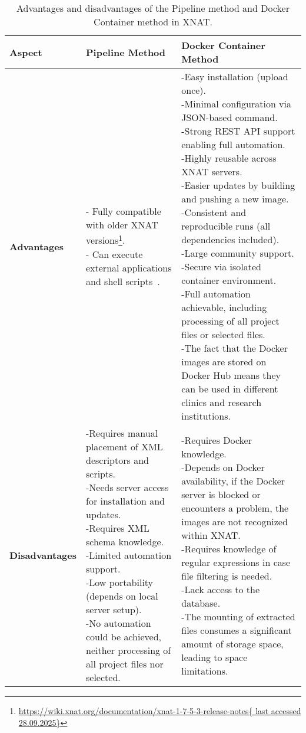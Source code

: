 \begin{table}[htbp]
\centering
\caption{Advantages and disadvantages of the Pipeline method and Docker Container method in XNAT.}
\renewcommand{\arraystretch}{1.3}
\begin{tabular}{|p{3cm}|p{6cm}|p{6cm}|}
\hline
\textbf{Aspect} & \textbf{Pipeline Method} & \textbf{Docker Container Method} \\
\hline
\textbf{Advantages} &
\parbox[t]{6cm}{
- Fully compatible with older XNAT versions\footnote{\url{https://wiki.xnat.org/documentation/xnat-1-7-5-3-release-notes{ last accessed 28.09.2025}}}.\\
- Can execute external applications and shell scripts~\cite{jansen_extending_2015}.
}
&
\parbox[t]{6cm}{
-Easy installation (upload once). \\
-Minimal configuration via JSON-based command. \\
-Strong REST API support enabling full automation. \\
-Highly reusable across XNAT servers. \\
-Easier updates by building and pushing a new image. \\
-Consistent and reproducible runs (all dependencies included). \\
-Large community support. \\
-Secure via isolated container environment. \\
-Full automation achievable, including processing of all
project files or selected files.\\
-The fact that the Docker images are stored on Docker Hub means they can be used in different clinics and research institutions.\\ 
} \\
\hline
\textbf{Disadvantages} &
\parbox[t]{6cm}{
-Requires manual placement of XML descriptors and scripts. \\
-Needs server access for installation and updates. \\
-Requires XML schema knowledge. \\
-Limited automation support. \\
-Low portability (depends on local server setup).\\
-No automation could be achieved, neither processing of all project files nor selected.\\
}
&
\parbox[t]{6cm}{
-Requires Docker knowledge. \\
-Depends on Docker availability, if the Docker server is blocked or encounters a problem, the images are not recognized within XNAT. \\
-Requires knowledge of regular expressions in case file filtering is needed.\\
-Lack access to the database. \\
-The mounting of extracted files consumes a significant amount of storage space, leading to space limitations.\\
} \\
\hline
\end{tabular}
\label{tab:docker_pipeline}
\end{table}


